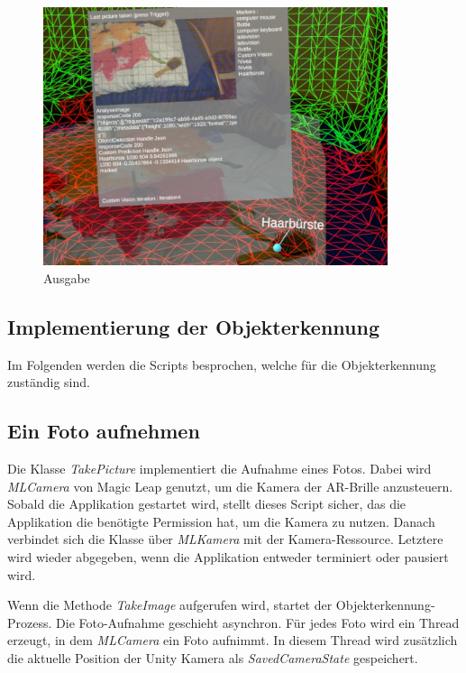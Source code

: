 \begin{figure}[H]
	\centering
	\includegraphics[width=0.9\textwidth]{images/ML_20201004_19.09.17_2.jpg}
	\caption[UI Ausgabe in der Szene]{Ausgabe}
	\label{img:ausgabe}
\end{figure}


\subsection{Implementierung der Objekterkennung}

Im Folgenden werden die Scripts besprochen, welche für die Objekterkennung zuständig sind.

\subsection{Ein Foto aufnehmen}

Die Klasse \textit{TakePicture} implementiert die Aufnahme eines Fotos. Dabei wird \textit{MLCamera} von Magic Leap genutzt, um die Kamera der AR-Brille anzusteuern. Sobald die Applikation gestartet wird, stellt dieses Script sicher, das die Applikation die benötigte Permission hat, um die Kamera zu nutzen. Danach verbindet sich die Klasse über \textit{MLKamera} mit der Kamera-Ressource. Letztere wird wieder abgegeben, wenn die Applikation entweder terminiert oder pausiert wird.

Wenn die Methode \textit{TakeImage} aufgerufen wird, startet der Objekterkennung-Prozess.
Die Foto-Aufnahme geschieht asynchron. Für jedes Foto wird ein Thread erzeugt, in dem \textit{MLCamera} ein Foto aufnimmt. In diesem Thread wird zusätzlich die aktuelle Position der Unity Kamera als \textit{SavedCameraState} gespeichert.

